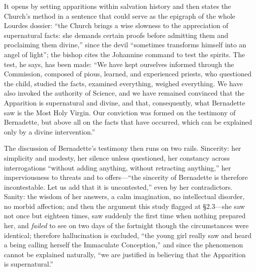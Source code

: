It opens by setting apparitions within salvation history and then
states the Church's method in a sentence that could serve as the
epigraph of the whole Lourdes dossier: ``the Church brings a wise
slowness to the appreciation of supernatural facts: she demands
certain proofs before admitting them and proclaiming them
divine,'' since the devil ``sometimes transforms himself into an
angel of light''; the bishop cites the Johannine command to test
the spirits. The test, he says, has
been made: ``We have kept ourselves informed through the
Commission, composed of pious, learned, and experienced priests,
who questioned the child, studied the facts, examined everything,
weighed everything. We have also invoked the authority of Science,
and we have remained convinced that the Apparition is supernatural
and divine, and that, consequently, what Bernadette saw is the
Most Holy Virgin. Our conviction was formed on the testimony of
Bernadette, but above all on the facts that have occurred, which
can be explained only by a divine intervention.''

The discussion of Bernadette's testimony then runs on two rails.
Sincerity: her simplicity and modesty, her silence unless
questioned, her constancy across interrogations ``without adding
anything, without retracting anything,'' her imperviousness to
threats and to offers---``the sincerity of Bernadette is therefore
incontestable. Let us add that it is uncontested,'' even by her
contradictors. Sanity: the wisdom of her answers, a calm
imagination, no intellectual disorder, no morbid affection; and
then the argument this study flagged at \S2.3---she saw not once
but eighteen times, saw suddenly the first time when nothing
prepared her, and \emph{failed} to see on two days of the
fortnight though the circumstances were identical; therefore
hallucination is excluded, ``the young girl really saw and heard a
being calling herself the Immaculate Conception,'' and since the
phenomenon cannot be explained naturally, ``we are justified in
believing that the Apparition is
supernatural.''


